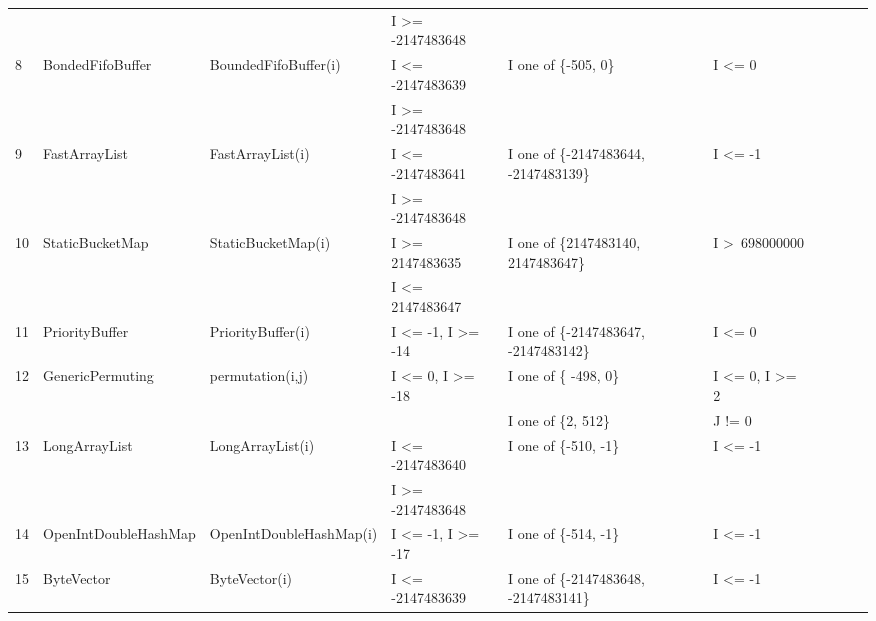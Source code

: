 \documentclass[runningheads,a4paper]{llncs}
\begin{document}
\begin{table}[h]
{{\begin{tabular}{|l|l|l|l|l|l|l|l|l|l|}
	&                                             &                                             & I \textgreater= -2147483648				& 										&  			   						\\
8	& BondedFifoBuffer			& BoundedFifoBuffer(i)		& I \textless= -2147483639 					& I one of \{-505, 0\} 					& I \textless= 0 						\\
	&                                             &                                             & I \textgreater= -2147483648				& 										&  			   						\\
9	& FastArrayList				& FastArrayList(i)				& I \textless= -2147483641 					& I one of \{-2147483644, -2147483139\}	& I \textless= -1						\\ 
	&                                             &                                             & I \textgreater= -2147483648				& 										&  			   						\\	
10	& StaticBucketMap			& StaticBucketMap(i)			& I \textgreater= 2147483635				& I one of \{2147483140, 2147483647\} 	& I \textgreater~698000000			\\ 
	&                                             &                                             & I \textless= 2147483647					& 										&  			   						\\	
11	& PriorityBuffer				& PriorityBuffer(i)				& I \textless= -1, I \textgreater= -14			& I one of \{-2147483647, -2147483142\}	& I \textless= 0						\\ 
12	& GenericPermuting			& permutation(i,j)			& I \textless= 0, I \textgreater= -18			& I one of \{ -498, 0\}					& I \textless= 0, I \textgreater= 2		\\ 
	&                                             &                                             & 											& I one of \{2, 512\}						& J != 0			   					\\
13	& LongArrayList				& LongArrayList(i)			& I \textless= -2147483640					& I one of \{-510, -1\}					& I \textless= -1						\\ 
	&                                             &                                             & I \textgreater= -2147483648				& 										&  			   						\\
14	& OpenIntDoubleHashMap	& OpenIntDoubleHashMap(i)	& I \textless= -1, I \textgreater= -17			& I one of \{-514, -1\}    					& I \textless= -1						\\ 
15	& ByteVector					& ByteVector(i)				& I \textless= -2147483639					& I one of \{-2147483648, -2147483141\}	& I \textless= -1						\\ 	

\end{tabular}}}
\end{table}
\end{document}
